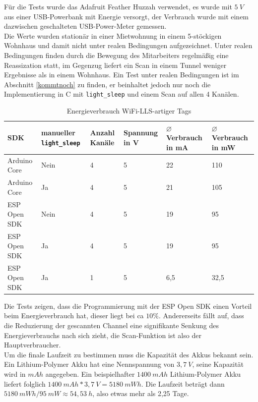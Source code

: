 Für die Tests wurde das Adafruit Feather Huzzah verwendet, es wurde mit $5\ V$ aus einer USB-Powerbank mit Energie versorgt, der Verbrauch wurde mit einem dazwischen geschalteten USB-Power-Meter gemessen.\\
Die Werte wurden stationär in einer Mietwohnung in einem 5-stöckigen Wohnhaus und damit nicht unter realen Bedingungen aufgezeichnet.
Unter realen Bedingungen finden durch die Bewegung des Mitarbeiters regelmäßig eine Reassization statt, im Gegenzug liefert ein Scan in einem Tunnel weniger Ergebnisse als in einem Wohnhaus.
Ein Test unter realen Bedingungen ist im Abschnitt \ref{kommtnoch} zu finden, er beinhaltet jedoch nur noch die Implementierung in C mit \texttt{light\_sleep} und einem Scan auf allen 4 Kanälen.

\begin{table}[h]
	\centering
	\caption{Energieverbrauch WiFi-LLS-artiger Tags}
	\label{table:llsconsumption}
	\begin{tabular}{p{3cm}|p{2.2cm}|p{1.5cm}|p{2cm}|p{2cm}|p{2cm}}
		SDK & manueller \texttt{light\_sleep} & Anzahl Kanäle & Spannung in V & $\varnothing$ Verbrauch in mA & $\varnothing$ Verbrauch in mW \\
		\hline
		Arduino Core & Nein & 4 & 5 & 22 & 110 \\
		Arduino Core & Ja & 4 & 5 & 21 & 105 \\
		ESP Open SDK & Nein & 4 & 5 & 19 & 95 \\
		ESP Open SDK & Ja & 4 & 5 & 19 & 95 \\
		\hline
		ESP Open SDK & Ja & 1 & 5 & 6,5 & 32,5 \\
	\end{tabular}
\end{table}

Die Tests zeigen, dass die Programmierung mit der ESP Open SDK einen Vorteil beim Energieverbrauch hat, dieser liegt bei ca $10\%$.
Andererseits fällt auf, dass die Reduzierung der gescannten Channel eine signifikante Senkung des Energieverbrauchs nach sich zieht, die Scan-Funktion ist also der Hauptverbraucher.\\
Um die finale Laufzeit zu bestimmen muss die Kapazität des Akkus bekannt sein.
Ein Lithium-Polymer Akku hat eine Nennspannung von $3,7\ V$, seine Kapazität wird in $mAh$ angegeben. 
Ein beispielhafter $1400\ mAh$ Lithium-Polymer Akku liefert folglich $1400\ mAh * 3,7\ V = 5180\ mWh$.
Die Laufzeit beträgt dann $5180\ mWh/95\ mW \approx 54,53\ h$, also etwas mehr als 2,25 Tage.

